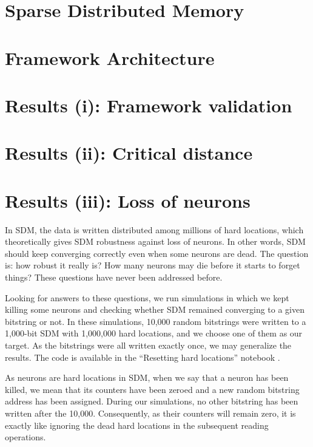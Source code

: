 \chapter{Sparse Distributed Memory}



\chapter{Framework Architecture}



\chapter{Results (i): Framework validation}



\chapter{Results (ii): Critical distance}



\chapter{Results (iii): Loss of neurons}
In SDM, the data is written distributed among millions of hard locations, which theoretically gives SDM robustness against loss of neurons. In other words, SDM should keep converging correctly even when some neurons are dead. The question is: how robust it really is? How many neurons may die before it starts to forget things? These questions have never been addressed before.

Looking for answers to these questions, we run simulations in which we kept killing some neurons and checking whether SDM remained converging to a given bitstring or not. In these simulations, 10,000 random bitstrings were written to a 1,000-bit SDM with 1,000,000 hard locations, and we choose one of them as our target. As the bitstrings were all written exactly once, we may generalize the results. The code is available in the ``Resetting hard locations'' notebook \citep{sdmframework}.

As neurons are hard locations in SDM, when we say that a neuron has been killed, we mean that its counters have been zeroed and a new random bitstring address has been assigned. During our simulations, no other bitstring has been written after the 10,000. Consequently, as their counters will remain zero, it is exactly like ignoring the dead hard locations in the subsequent reading operations.

